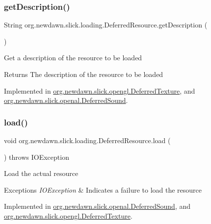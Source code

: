 \subsubsection{\texorpdfstring{get\+Description()}{getDescription()}}
{\footnotesize\ttfamily String org.\+newdawn.\+slick.\+loading.\+Deferred\+Resource.\+get\+Description (\begin{DoxyParamCaption}{ }\end{DoxyParamCaption})}

Get a description of the resource to be loaded

\begin{DoxyReturn}{Returns}
The description of the resource to be loaded 
\end{DoxyReturn}


Implemented in \mbox{\hyperlink{classorg_1_1newdawn_1_1slick_1_1opengl_1_1_deferred_texture_abf9a5bb64c03d9607eb4e2a9afffbe33}{org.\+newdawn.\+slick.\+opengl.\+Deferred\+Texture}}, and \mbox{\hyperlink{classorg_1_1newdawn_1_1slick_1_1openal_1_1_deferred_sound_ade00f475d697e1a4152be52b478210cc}{org.\+newdawn.\+slick.\+openal.\+Deferred\+Sound}}.

\mbox{\label{interfaceorg_1_1newdawn_1_1slick_1_1loading_1_1_deferred_resource_a08c6171e3a44634c06c9160f5b785ad6}} 
\subsubsection{\texorpdfstring{load()}{load()}}
{\footnotesize\ttfamily void org.\+newdawn.\+slick.\+loading.\+Deferred\+Resource.\+load (\begin{DoxyParamCaption}{ }\end{DoxyParamCaption}) throws I\+O\+Exception}

Load the actual resource


\begin{DoxyExceptions}{Exceptions}
{\em I\+O\+Exception} & Indicates a failure to load the resource \\
\hline
\end{DoxyExceptions}


Implemented in \mbox{\hyperlink{classorg_1_1newdawn_1_1slick_1_1openal_1_1_deferred_sound_a4f7e7f24c22aa787cc38ef670c4e4dc8}{org.\+newdawn.\+slick.\+openal.\+Deferred\+Sound}}, and \mbox{\hyperlink{classorg_1_1newdawn_1_1slick_1_1opengl_1_1_deferred_texture_adaa55791770295ee94c057781634b50a}{org.\+newdawn.\+slick.\+opengl.\+Deferred\+Texture}}.

